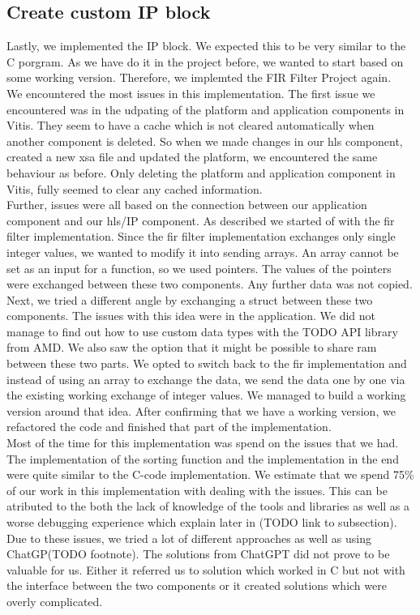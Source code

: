 \documentclass[conference]{IEEEtran}
\begin{document}
\subsection{Create custom IP block}
Lastly, we implemented the IP block. We expected this to be very similar to the C porgram. As we have do it in the project before, we wanted to start based on some working version. Therefore, we implemted the FIR Filter Project again. \\
We encountered the most issues in this implementation. The first issue we encountered was in the udpating of the platform and application components in Vitis. They seem to have a cache which is not cleared automatically when another component is deleted. So when we made changes in our hls component, created a new xsa file and updated the platform, we encountered the same behaviour as before. Only deleting the platform and application component in Vitis, fully seemed to clear any cached information. \\
Further, issues were all based on the connection between our application component and our hls/IP component. As described we started of with the fir filter implementation. Since the fir filter implementation exchanges only single integer values, we wanted to modify it into sending arrays. An array cannot be set as an input for a function, so we used pointers. The values of the pointers were exchanged between these two components. Any further data was not copied. Next, we tried a different angle by exchanging a struct between these two components. The issues with this idea were in the application. We did not manage to find out how to use custom data types with the TODO API library from AMD. We also saw the option that it might be possible to share ram between these two parts. We opted to switch back to the fir implementation and instead of using an array to exchange the data, we send the data one by one via the existing working exchange of integer values. We managed to build a working version around that idea. After confirming that we have a working version, we refactored the code and finished that part of the implementation. \\
Most of the time for this implementation was spend on the issues that we had. The implementation of the sorting function and the implementation in the end were quite similar to the C-code implementation. We estimate that we spend 75\% of our work in this implementation with dealing with the issues. This can be atributed to the both the lack of knowledge of the tools and libraries as well as a worse debugging experience which explain later in (TODO link to subsection). Due to these issues, we tried a lot of different approaches as well as using ChatGP(TODO footnote). The solutions from ChatGPT did not prove to be valuable for us. Either it referred us to solution which worked in C but not with the interface between the two components or it created solutions which were overly complicated.
\end{document}
